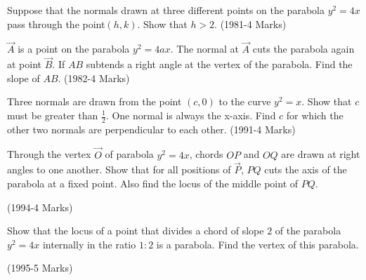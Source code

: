 
\iffalse
  \title{ASSIGNMENT-1}
  \author{EE24BTECH11032- JOHN BOBBY}
  \section{subjective}
\fi

    \item Suppose that the normals drawn at three different points on the parabola $y^2=4x$ pass through the point$(h,k)$. Show that $h>2$. 
		\hfill(1981-4 Marks)
		
	\item $\vec{A}$ is a point on the parabola $y^2=4ax$. The normal at $\vec{A}$ cuts the parabola again at point $\vec{B}$. If $AB$ subtends a right angle at the vertex of the parabola. Find the slope of $AB$.  
		\hfill(1982-4 Marks)
		
	\item Three normals are drawn from the point $(c,0)$ to the curve $y^2=x$. Show that $c$ must be greater than $\frac{1}{2}$. One normal is always the x-axis. Find $c$ for which the other two normals are perpendicular to each other. 
	      \hfill(1991-4 Marks)
		
      \item Through the vertex $\vec{O}$ of parabola $y^2=4x$, chords $OP$ and $OQ$ are drawn at right angles to one another. Show that for all positions of $\vec{P}$, $PQ$ cuts the axis of the parabola at a fixed point. Also find the locus of the middle point of $PQ$. 

		\hfill(1994-4 Marks)
		
      \item Show that the locus of a point that divides a chord of slope $2$ of the parabola $y^2=4x$ internally in the ratio $1:2$ is a parabola. Find the vertex of this parabola. 

	      \hfill(1995-5 Marks)

